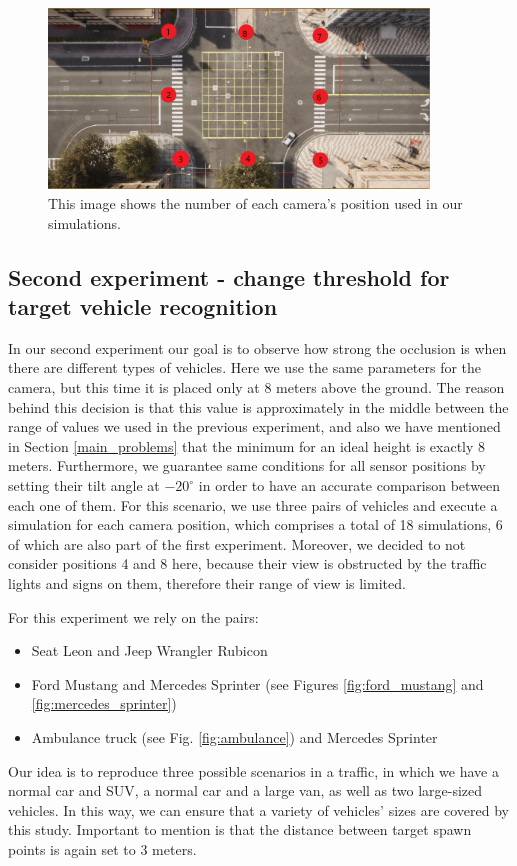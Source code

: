 \begin{figure} [h!]
    \centering
    \includegraphics[width=0.90\textwidth]{images/positions_numerated.png}
    \caption[Enumerated camera positions]{This image shows the number of each camera's position used in our simulations.}
    \label{fig:positions_enumerated}
\end{figure}

\newpage
\subsection{Second experiment - change threshold for target vehicle recognition}
In our second experiment our goal is to observe how strong the occlusion is when there are different types of vehicles. Here we use the same parameters for the camera, but this time it is placed only at 8 meters above the ground. The reason behind this decision is that this value is approximately in the middle between the range of values we used in the previous experiment, and also we have mentioned in Section \ref{main_problems} that the minimum for an ideal height is exactly 8 meters. Furthermore, we guarantee same conditions for all sensor positions by setting their tilt angle at $-20^{\circ}$ in order to have an accurate comparison between each one of them. For this scenario, we use three pairs of vehicles and execute a simulation for each camera position, which comprises a total of 18 simulations, 6 of which are also part of the first experiment. Moreover, we decided to not consider positions 4 and 8 here, because their view is obstructed by the traffic lights and signs on them, therefore their range of view is limited.

For this experiment we rely on the pairs:
\begin{itemize}
    \item Seat Leon and Jeep Wrangler Rubicon
    \item Ford Mustang and Mercedes Sprinter (see Figures \ref{fig:ford_mustang} and \ref{fig:mercedes_sprinter})
    \item Ambulance truck (see Fig. \ref{fig:ambulance}) and Mercedes Sprinter
\end{itemize}
Our idea is to reproduce three possible scenarios in a traffic, in which we have a normal car and SUV, a normal car and a large van, as well as two large-sized vehicles. In this way, we can ensure that a variety of vehicles' sizes are covered by this study. Important to mention is that the distance between target spawn points is again set to 3 meters. 


